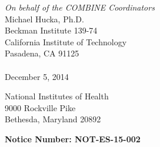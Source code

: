 \documentclass[11pt,letterpaper]{article}
\begin{document}
\thispagestyle{empty}



\hspace{4in}%
\begin{flushright}
\begin{minipage}{3in}
\emph{On behalf of the COMBINE Coordinators}\\[2pt]
Michael Hucka, Ph.D.\\
Beckman Institute 139-74\\
California Institute of Technology\\
Pasadena, CA 91125\\
\\
December 5, 2014
\end{minipage}
\end{flushright}

\vspace*{2ex}

\begin{flushleft}
National Institutes of Health\\
9000 Rockville Pike\\
Bethesda, Maryland 20892
\end{flushleft}

\setlength{\parskip}{0.7em}

\noindent
\textbf{Notice Number: NOT-ES-15-002}
\begin{flushleft}

\end{flushleft}

\clearpage



\end{document}
